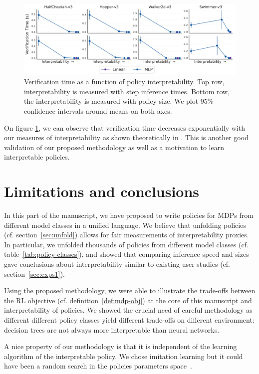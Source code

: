 \begin{figure}[ht]
    \centering
    \includegraphics[width=1\linewidth]{images/images_part3/verification_tradeoff.pdf}
    \caption{Verification time as a function of policy interpretability. Top row, interpretability is measured with step inference times. Bottom row, the interpretability is measured with policy size. We plot 95\% confidence intervals around means on both axes.}
    \label{fig:trade-off-verif}
\end{figure}

On figure \ref{fig:trade-off-verif}, we can observe that verification time decreases exponentially with our measures of interpretability as shown theoretically in \cite{lens-complexity}.
This is another good validation of our proposed methodology as well as a motivation to learn interpretable policies. 

\section{Limitations and conclusions}\label{sec:ccl-imit}
In this part of the manuscript, we have proposed to write policies for MDPs from different model classes in a unified language.
We believe that unfolding policies (cf. section~\ref{sec:unfold}) allows for fair measurements of interpretability proxies.
In particular, we unfolded thousands of policies from different model classes (cf. table~\ref{tab:policy-classes}), and showed that comparing inference speed and sizes gave conclusions about interpretability similar to existing user studies (cf. section~\ref{sec:exps1}).

Using the proposed methodology, we were able to illustrate the trade-offs between the RL objective (cf. definition~\ref{def:mdp-obj}) at the core of this manuscript and interpretability of policies.
We showed the crucial need of careful methodology as different different policy classes yield different trade-offs on different environment: decision trees are not always more interpretable than neural networks. 

A nice property of our methodology is that it is independent of the learning algorithm of the interpretable policy.
We chose imitation learning but it could have been a random search in the policies parameters space~\cite{random-search}.

